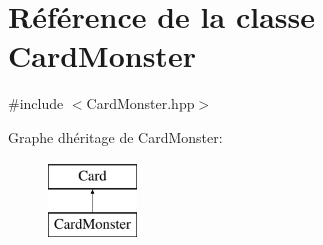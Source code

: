 \hypertarget{classCardMonster}{}\section{Référence de la classe Card\+Monster}
\label{classCardMonster}


{\ttfamily \#include $<$Card\+Monster.\+hpp$>$}

Graphe d\textquotesingle{}héritage de Card\+Monster\+:\begin{figure}[H]
\begin{center}
\leavevmode
\includegraphics[height=2.000000cm]{classCardMonster}
\end{center}
\end{figure}
